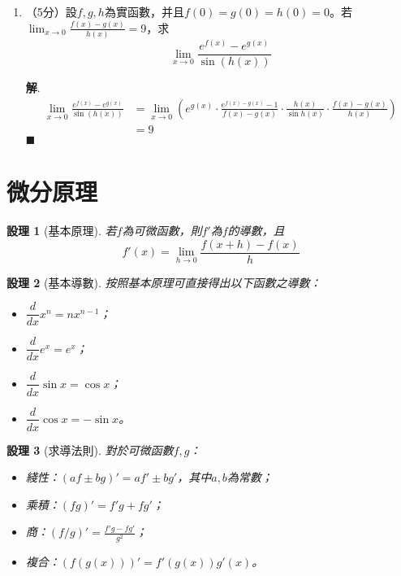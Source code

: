 \documentclass[12pt]{article}
\newtheorem*{proposition}{設理}
\newenvironment*{sol}{\par \textbf{解}.}{\hfill$\blacksquare$}
\begin{document}
    \begin{enumerate}
        \item （5分）設$f,g,h$為實函數，并且$f(0)=g(0)=h(0)=0$。若$\lim_{x\to 0}\frac{f(x)-g(x)}{h(x)}=9$，求$$\lim_{x\to 0}\frac{e^{f(x)}-e^{g(x)}}{\sin(h(x))}$$\begin{sol}
            \begin{align*}
                \lim_{x\to 0}\frac{e^{f(x)}-e^{g(x)}}{\sin(h(x))}&=\lim_{x\to 0}(e^{g(x)}\cdot\frac{e^{f(x)-g(x)}-1}{f(x)-g(x)}\cdot\frac{h(x)}{\sin{h(x)}}\cdot\frac{f(x)-g(x)}{h(x)})\\
                &=9
            \end{align*}
        \end{sol}
    \end{enumerate}

    \section*{微分原理}

    \begin{proposition}[基本原理]
        若$f$為可微函數，則$f'$為$f$的導數，且$$f'(x)=\lim_{h\to 0}\frac{f(x+h)-f(x)}{h}$$
    \end{proposition}

    \begin{proposition}[基本導數]
        按照基本原理可直接得出以下函數之導數：\begin{itemize}
            \item $\dfrac{d}{dx}x^n=nx^{n-1}$；
            \item $\dfrac{d}{dx}e^x=e^x$；
            \item $\dfrac{d}{dx}\sin{x}=\cos{x}$；
            \item $\dfrac{d}{dx}\cos{x}=-\sin{x}$。
        \end{itemize}
    \end{proposition}

    \begin{proposition}[求導法則]
        對於可微函數$f,g$：\begin{itemize}
            \item 綫性：$(af\pm bg)'=af'\pm bg'$，其中$a,b$為常數；
            \item 乘積：$(fg)'=f'g+fg'$；
            \item 商：$(f/g)'=\frac{f'g-fg'}{g^2}$；
            \item 複合：$(f(g(x)))'=f'(g(x))g'(x)$。
        \end{itemize}
    \end{proposition}
\end{document}
